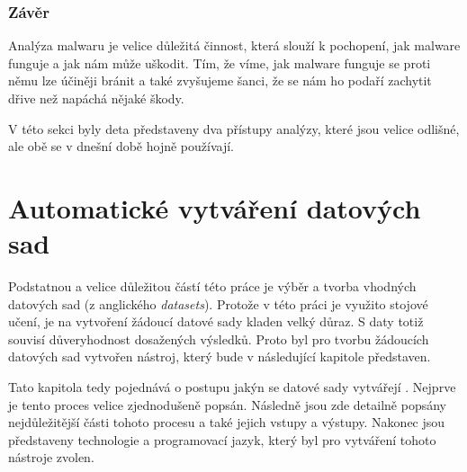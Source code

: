 \subsection*{Závěr}
Analýza malwaru je velice důležitá činnost, která slouží k pochopení, jak malware funguje a jak nám může uškodit. Tím, že víme, jak malware funguje se proti němu lze účiněji bránit a také zvyšujeme šanci, že se nám ho 
podaří zachytit dřive než napáchá nějaké škody. 

V této sekci byly deta představeny dva přístupy analýzy, které jsou velice odlišné, ale obě se v dnešní době hojně používají.


\chapter{Automatické vytváření datových sad} \label{3.chap}

Podstatnou a velice důležitou částí této práce je výběr a tvorba vhodných datových sad (z anglického \textit{datasets}).
Protože v této práci je využito stojové učení, je na vytvoření žádoucí datové sady kladen velký důraz. 
S daty totiž souvisí důveryhodnost dosažených výsledků.
Proto byl pro tvorbu žádoucích datových sad vytvořen nástroj, který bude v následující kapitole představen. 

Tato kapitola tedy pojednává o postupu jakýn se datové sady vytvářejí . Nejprve je tento proces velice zjednodušeně popsán.
Následně jsou zde detailně popsány nejdůležitější části tohoto procesu a také jejich vstupy a výstupy.
Nakonec jsou představeny technologie a programovací jazyk, který byl pro vytváření tohoto nástroje zvolen. 

